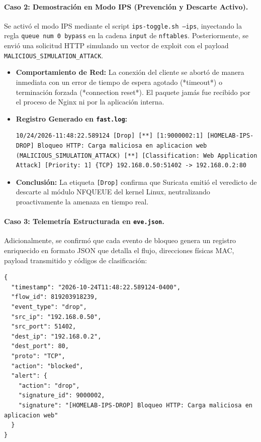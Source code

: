 \paragraph{Caso 2: Demostración en Modo IPS (Prevención y Descarte Activo).}
Se activó el modo IPS mediante el script \texttt{ips-toggle.sh --ips}, inyectando la regla \texttt{queue num 0 bypass} en la cadena \texttt{input} de \texttt{nftables}. Posteriormente, se envió una solicitud HTTP simulando un vector de exploit con el payload \texttt{MALICIOUS\_SIMULATION\_ATTACK}.
\begin{itemize}
  \item \textbf{Comportamiento de Red:} La conexión del cliente se abortó de manera inmediata con un error de tiempo de espera agotado (*timeout*) o terminación forzada (*connection reset*). El paquete jamás fue recibido por el proceso de Nginx ni por la aplicación interna.
  \item \textbf{Registro Generado en \texttt{fast.log}:}
\begin{lstlisting}[style=terminal]
10/24/2026-11:48:22.589124 [Drop] [**] [1:9000002:1] [HOMELAB-IPS-DROP] Bloqueo HTTP: Carga maliciosa en aplicacion web (MALICIOUS_SIMULATION_ATTACK) [**] [Classification: Web Application Attack] [Priority: 1] {TCP} 192.168.0.50:51402 -> 192.168.0.2:80
\end{lstlisting}
  \item \textbf{Conclusión:} La etiqueta \texttt{[Drop]} confirma que Suricata emitió el veredicto de descarte al módulo NFQUEUE del kernel Linux, neutralizando proactivamente la amenaza en tiempo real.
\end{itemize}

\paragraph{Caso 3: Telemetría Estructurada en \texttt{eve.json}.}
Adicionalmente, se confirmó que cada evento de bloqueo genera un registro enriquecido en formato JSON que detalla el flujo, direcciones físicas MAC, payload transmitido y códigos de clasificación:

\begin{lstlisting}[style=terminal]
{
  "timestamp": "2026-10-24T11:48:22.589124-0400",
  "flow_id": 819203918239,
  "event_type": "drop",
  "src_ip": "192.168.0.50",
  "src_port": 51402,
  "dest_ip": "192.168.0.2",
  "dest_port": 80,
  "proto": "TCP",
  "action": "blocked",
  "alert": {
    "action": "drop",
    "signature_id": 9000002,
    "signature": "[HOMELAB-IPS-DROP] Bloqueo HTTP: Carga maliciosa en aplicacion web"
  }
}
\end{lstlisting}
